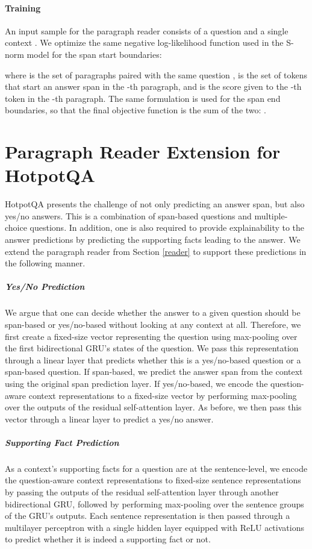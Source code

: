 \documentclass[11pt,a4paper,dvipsnames]{article}
\begin{document}
\paragraph{Training}
An input sample for the paragraph reader consists of a question and a single context . 
We optimize the same negative log-likelihood function used in the S-norm model for the span start boundaries:

where  is the set of paragraphs paired with the same question ,  is the set of tokens that start an answer span in the -th paragraph, and  is the score given to the -th token in the -th paragraph. The same formulation is used for the span end boundaries, so that the final objective function is the sum of the two: .

\section{Paragraph Reader Extension for HotpotQA}
\label{sec:hotpot_extension}
HotpotQA presents the challenge of not only predicting an answer span, but also yes/no answers. This is a combination of span-based questions and multiple-choice questions. In addition, one is also required to provide explainability to the answer predictions by predicting the supporting facts leading to the answer. We extend the paragraph reader from Section \ref{reader} to support these predictions in the following manner.
\subparagraph{Yes/No Prediction}
We argue that one can decide whether the answer to a given question should be span-based or yes/no-based without looking at any context at all. Therefore, we first create a fixed-size vector representing the question using max-pooling over the first bidirectional GRU's states of the question. We pass this representation through a linear layer that predicts whether this is a yes/no-based question or a span-based question. If span-based, we predict the answer span from the context using the original span prediction layer. If yes/no-based, we encode the question-aware context representations to a fixed-size vector by performing max-pooling over the outputs of the residual self-attention layer. As before, we then pass this vector through a linear layer to predict a yes/no answer.
\subparagraph{Supporting Fact Prediction}
As a context's supporting facts for a question are at the sentence-level, we encode the question-aware context representations to fixed-size sentence representations by passing the outputs of the residual self-attention layer through another bidirectional GRU, followed by performing max-pooling over the sentence groups of the GRU's outputs. Each sentence representation is then passed through a multilayer perceptron with a single hidden layer equipped with ReLU activations to predict whether it is indeed a supporting fact or not.
\end{document}
